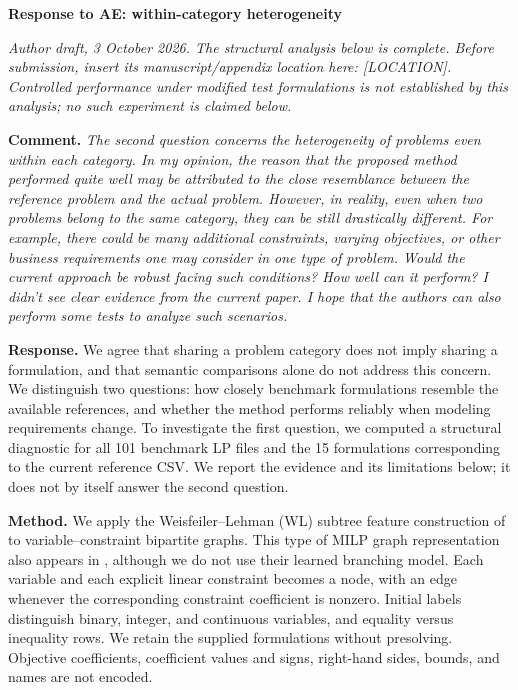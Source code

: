 \documentclass[10pt]{article}
\begin{document}
\textbf{Response to AE: within-category heterogeneity}

\textit{Author draft, 3 October 2026. The structural analysis below is complete.
Before submission, insert its manuscript/appendix location here: [LOCATION].
Controlled performance under modified test formulations is not established by
this analysis; no such experiment is claimed below.}

\textbf{Comment.} \textit{The second question concerns the heterogeneity of problems even within each category. In my opinion, the reason that the proposed method performed quite well may be attributed to the close resemblance between the reference problem and the actual problem. However, in reality, even when two problems belong to the same category, they can be still drastically different. For example, there could be many additional constraints, varying objectives, or other business requirements one may consider in one type of problem. Would the current approach be robust facing such conditions? How well can it perform? I didn't see clear evidence from the current paper. I hope that the authors can also perform some tests to analyze such scenarios.}

\begingroup\color{replyblue}
\textbf{Response.} We agree that sharing a problem category does not imply sharing
a formulation, and that semantic comparisons alone do not address this concern.
We distinguish two questions: how closely benchmark formulations resemble the
available references, and whether the method performs reliably when modeling
requirements change. To investigate the first question, we computed a structural
diagnostic for all 101 benchmark LP files and the 15 formulations corresponding
to the current reference CSV. We report the evidence and its limitations below;
it does not by itself answer the second question.

\textbf{Method.} We apply the Weisfeiler--Lehman (WL) subtree feature construction
of \citet{Shervashidze2011} to variable--constraint bipartite graphs. This type of
MILP graph representation also appears in \citet{Gasse2019}, although we do not
use their learned branching model. Each variable and each explicit linear
constraint becomes a node, with an edge whenever the corresponding constraint
coefficient is nonzero. Initial labels distinguish binary, integer, and
continuous variables, and equality versus inequality rows. We retain the
supplied formulations without presolving. Objective coefficients, coefficient
values and signs, right-hand sides, bounds, and names are not encoded.
\end{document}
